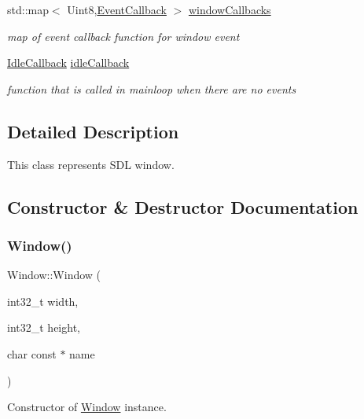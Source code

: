 \begin{DoxyCompactItemize}
\mbox{\label{classWindow_a559418e04c7331f18d899f0570416631}} 
std\+::map$<$ Uint8,\hyperlink{classWindow_a0e7a1332f3c35705eeed4d7b1a568d61}{Event\+Callback} $>$ \hyperlink{classWindow_a559418e04c7331f18d899f0570416631}{window\+Callbacks}
\begin{DoxyCompactList}\small\item\em map of event callback function for window event \end{DoxyCompactList}\item 
\mbox{\label{classWindow_aca8fcf0113fd079f5bc4050c1f72a93b}} 
\hyperlink{classWindow_ae666e38583ffdec789fdfc85d6504d73}{Idle\+Callback} \hyperlink{classWindow_aca8fcf0113fd079f5bc4050c1f72a93b}{idle\+Callback}
\begin{DoxyCompactList}\small\item\em function that is called in mainloop when there are no events \end{DoxyCompactList}\end{DoxyCompactItemize}


\subsection{Detailed Description}
This class represents S\+DL window. 

\subsection{Constructor \& Destructor Documentation}
\mbox{\label{classWindow_ac84f7bfb1b67b73c69a582fe72339192}} 
\subsubsection{\texorpdfstring{Window()}{Window()}}
{\footnotesize\ttfamily Window\+::\+Window (\begin{DoxyParamCaption}\item[{int32\+\_\+t}]{width,  }\item[{int32\+\_\+t}]{height,  }\item[{char const $\ast$}]{name }\end{DoxyParamCaption})}



Constructor of \hyperlink{classWindow}{Window} instance. 


